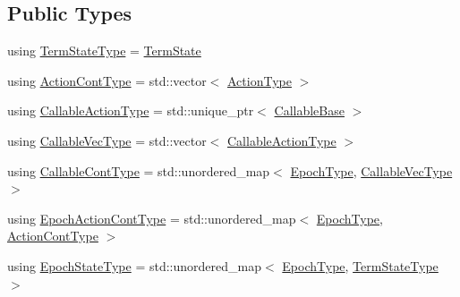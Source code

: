 \subsection*{Public Types}
\begin{DoxyCompactItemize}
\item 
using \hyperlink{structvt_1_1term_1_1_term_action_ae4c635b69751d887666814700ed64d65}{Term\+State\+Type} = \hyperlink{structvt_1_1term_1_1_term_state}{Term\+State}
\item 
using \hyperlink{structvt_1_1term_1_1_term_action_a3b7ff49ce82fc33a7a1ebda8797c02b7}{Action\+Cont\+Type} = std\+::vector$<$ \hyperlink{namespacevt_ae0a5a7b18cc99d7b732cb4d44f46b0f3}{Action\+Type} $>$
\item 
using \hyperlink{structvt_1_1term_1_1_term_action_aa4a32326730b20530526e1db6512c017}{Callable\+Action\+Type} = std\+::unique\+\_\+ptr$<$ \hyperlink{structvt_1_1term_1_1_callable_base}{Callable\+Base} $>$
\item 
using \hyperlink{structvt_1_1term_1_1_term_action_ad9e499fefd57d3bea8e0cae68a6b7f61}{Callable\+Vec\+Type} = std\+::vector$<$ \hyperlink{structvt_1_1term_1_1_term_action_aa4a32326730b20530526e1db6512c017}{Callable\+Action\+Type} $>$
\item 
using \hyperlink{structvt_1_1term_1_1_term_action_a802aaa899ce87dc9f8a53d43b202044c}{Callable\+Cont\+Type} = std\+::unordered\+\_\+map$<$ \hyperlink{namespacevt_a985a5adf291c34a3ca263b3378388236}{Epoch\+Type}, \hyperlink{structvt_1_1term_1_1_term_action_ad9e499fefd57d3bea8e0cae68a6b7f61}{Callable\+Vec\+Type} $>$
\item 
using \hyperlink{structvt_1_1term_1_1_term_action_acefe3cb1e2a2bcf0d530082f53a2bada}{Epoch\+Action\+Cont\+Type} = std\+::unordered\+\_\+map$<$ \hyperlink{namespacevt_a985a5adf291c34a3ca263b3378388236}{Epoch\+Type}, \hyperlink{structvt_1_1term_1_1_term_action_a3b7ff49ce82fc33a7a1ebda8797c02b7}{Action\+Cont\+Type} $>$
\item 
using \hyperlink{structvt_1_1term_1_1_term_action_afcbc07a9b40ff2b6d53e9522877a745d}{Epoch\+State\+Type} = std\+::unordered\+\_\+map$<$ \hyperlink{namespacevt_a985a5adf291c34a3ca263b3378388236}{Epoch\+Type}, \hyperlink{structvt_1_1term_1_1_term_action_ae4c635b69751d887666814700ed64d65}{Term\+State\+Type} $>$
\end{DoxyCompactItemize}
